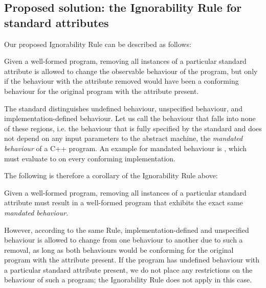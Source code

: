 \subsection{Proposed solution: the Ignorability Rule for standard attributes}
\label{subsec:proposal_semantic}

Our proposed Ignorability Rule can be described as follows:

\begin{adjustwidth}{0.5cm}{0.5cm}
Given a well-formed program, removing all instances of a particular standard attribute is allowed to change the observable behaviour of the program, but only if the behaviour with the attribute removed would have been a conforming behaviour for the original program with the attribute present.
\end{adjustwidth}

The standard distinguishes undefined behaviour, unspecified behaviour, and implementation-defined behaviour. Let us call the behaviour that falls into none of these regions, i.e. the behaviour that is fully specified by the standard and does not depend on any input parameters to the abstract machine, the \emph{mandated behaviour} of a C++ program. An example for mandated behaviour is , which must evaluate to  on every conforming implementation.

The following is therefore a corollary of the Ignorability Rule above:

\begin{adjustwidth}{0.5cm}{0.5cm}
Given a well-formed program, removing all instances of a particular standard attribute must result in a well-formed program that exhibits the exact same \emph{mandated behaviour}. 
\end{adjustwidth}

However, according to the same Rule, implementation-defined and unspecified behaviour is allowed to change from one behaviour to another due to such a removal, as long as both behaviours would be conforming for the original program with the attribute present. If the program has undefined behaviour with a particular standard attribute present, we do not place any restrictions on the behaviour of such a program; the Ignorability Rule does not apply in this case.

